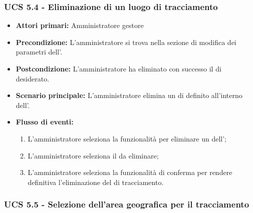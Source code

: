 \subsubsection{UCS 5.4 - Eliminazione di un luogo di tracciamento}%
\begin{itemize}
    \item \textbf{Attori primari:} Amministratore gestore
    \item \textbf{Precondizione:} L'amministratore si trova nella sezione di modifica dei parametri dell'.
    \item \textbf{Postcondizione:} L'amministratore ha eliminato con successo il  di  desiderato.
    \item \textbf{Scenario principale:} L'amministratore elimina un  di  definito all'interno dell'.
    \item \textbf{Flusso di eventi:}
    \begin{enumerate}%
        \item L'amministratore seleziona la funzionalità per eliminare un  dell';
        \item L'amministratore seleziona il  da eliminare;
        \item L'amministratore seleziona la funzionalità di conferma per rendere definitiva l'eliminazione del  di tracciamento.
    \end{enumerate}
\end{itemize}

\subsubsection{UCS 5.5 - Selezione dell'area geografica per il tracciamento}%


